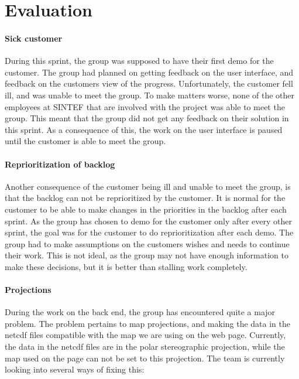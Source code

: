 \documentclass[11pt,a4paper,titlepage,oneside]{report}
\begin{document}
\section{Evaluation}
\paragraph{Sick customer}
During this sprint, the group was supposed to have their first demo for the customer. The group had planned on getting feedback on the user interface, and feedback on the customers view of the progress. Unfortunately, the customer fell ill, and was unable to meet the group. To make matters worse, none of the other employees at SINTEF that are involved with the project was able to meet the group. This meant that the group did not get any feedback on their solution in this sprint. As a consequence of this, the work on the user interface is paused until the customer is able to meet the group. 

\paragraph{Reprioritization of backlog}
Another consequence of the customer being ill and unable to meet the group, is that the backlog can not be reprioritized by the customer. It is normal for the customer to be able to make changes in the priorities in the backlog after each sprint. As the group has chosen to demo for the customer only after every other sprint, the goal was for the customer to do reprioritization after each demo. The group had to make assumptions on the customers wishes and needs to continue their work. This is not ideal, as the group may not have enough information to make these decisions, but it is better than stalling work completely. 

\paragraph{Projections}
During the work on the back end, the group has encountered quite a major problem. The problem pertains to map projections, and making the data in the \gls{netcdf} files compatible with the map we are using on the web page. Currently, the data in the \gls{netcdf} files are in the polar stereographic projection, while the map used on the page can not be set to this projection. The team is currently looking into several ways of fixing this:
\end{document}
